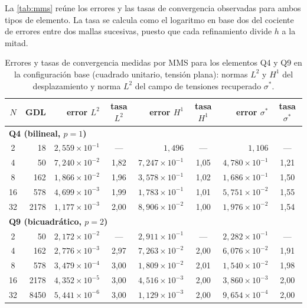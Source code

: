 La \autoref{tab:mms} reúne los errores y las tasas de convergencia observadas para ambos tipos de elemento. La tasa se calcula como el logaritmo en base dos del cociente de errores entre dos mallas sucesivas, puesto que cada refinamiento divide $h$ a la mitad.

\begin{table}[htbp]
\centering
\caption[Errores y tasas de convergencia medidas por MMS (configuración base).]{Errores y tasas de convergencia medidas por MMS para los elementos Q4 y Q9 en la configuración base (cuadrado unitario, tensión plana): normas $L^2$ y $H^1$ del desplazamiento y norma $L^2$ del campo de tensiones recuperado $\sigma^*$.}
\label{tab:mms}
\small
\setlength{\tabcolsep}{4pt}
\begin{tabular}{c r r c r c r c}
\hline
$N$ & GDL & error $L^2$ & tasa $L^2$ & error $H^1$ & tasa $H^1$ & error $\sigma^*$ & tasa $\sigma^*$ \\
\hline
\multicolumn{8}{l}{\textbf{Q4 (bilineal, $p=1$)}} \\
2  & 18   & $2{,}559\times10^{-1}$ & ---  & $1{,}496$               & ---  & $1{,}106$              & ---  \\
4  & 50   & $7{,}240\times10^{-2}$ & 1,82 & $7{,}247\times10^{-1}$  & 1,05 & $4{,}780\times10^{-1}$ & 1,21 \\
8  & 162  & $1{,}866\times10^{-2}$ & 1,96 & $3{,}578\times10^{-1}$  & 1,02 & $1{,}686\times10^{-1}$ & 1,50 \\
16 & 578  & $4{,}699\times10^{-3}$ & 1,99 & $1{,}783\times10^{-1}$  & 1,01 & $5{,}751\times10^{-2}$ & 1,55 \\
32 & 2178 & $1{,}177\times10^{-3}$ & 2,00 & $8{,}906\times10^{-2}$  & 1,00 & $1{,}976\times10^{-2}$ & 1,54 \\
\hline
\multicolumn{8}{l}{\textbf{Q9 (bicuadrático, $p=2$)}} \\
2  & 50   & $2{,}172\times10^{-2}$ & ---  & $2{,}911\times10^{-1}$  & ---  & $2{,}282\times10^{-1}$ & ---  \\
4  & 162  & $2{,}776\times10^{-3}$ & 2,97 & $7{,}263\times10^{-2}$  & 2,00 & $6{,}076\times10^{-2}$ & 1,91 \\
8  & 578  & $3{,}479\times10^{-4}$ & 3,00 & $1{,}809\times10^{-2}$  & 2,01 & $1{,}540\times10^{-2}$ & 1,98 \\
16 & 2178 & $4{,}352\times10^{-5}$ & 3,00 & $4{,}516\times10^{-3}$  & 2,00 & $3{,}860\times10^{-3}$ & 2,00 \\
32 & 8450 & $5{,}441\times10^{-6}$ & 3,00 & $1{,}129\times10^{-3}$  & 2,00 & $9{,}654\times10^{-4}$ & 2,00 \\
\hline
\end{tabular}
\end{table}

